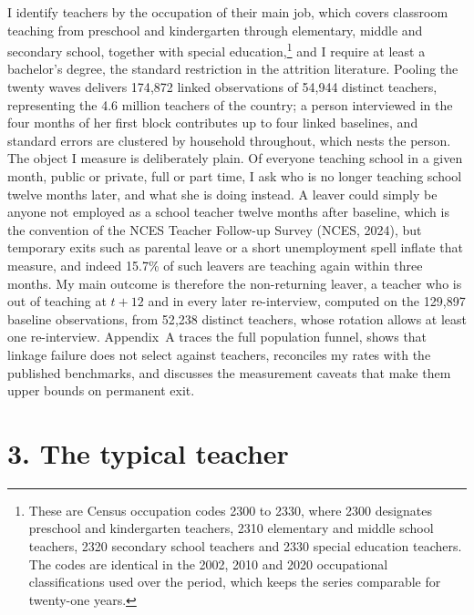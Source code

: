 \documentclass[11pt,a4paper]{article}
\begin{document}
I identify teachers by the occupation of their main job, which covers
classroom teaching from preschool and kindergarten through elementary,
middle and secondary school, together with special
education,\footnote{These are Census occupation codes 2300 to 2330, where
2300 designates preschool and kindergarten teachers, 2310 elementary and
middle school teachers, 2320 secondary school teachers and 2330 special
education teachers. The codes are identical in the 2002, 2010 and 2020
occupational classifications used over the period, which keeps the series
comparable for twenty-one years.} and I require at least a bachelor's
degree, the standard restriction in the attrition literature. Pooling the
twenty waves delivers 174{,}872 linked observations of 54{,}944 distinct
teachers, representing the 4.6 million teachers of the country; a person
interviewed in the four months of her first block contributes up to four
linked baselines, and standard errors are clustered by household
throughout, which nests the person. The object I measure is deliberately
plain. Of everyone teaching school in a given month, public or private,
full or part time, I ask who is no longer teaching school twelve months
later, and what she is doing instead. A leaver could simply be anyone not
employed as a school teacher twelve months after baseline, which is the
convention of the NCES Teacher Follow-up Survey (NCES, 2024), but temporary exits such as
parental leave or a short unemployment spell inflate that measure, and
indeed 15.7\% of such leavers are teaching again within three months. My
main outcome is therefore the non-returning leaver, a teacher who is out of
teaching at $t{+}12$ and in every later re-interview, computed on the
129{,}897 baseline observations, from 52{,}238 distinct teachers, whose
rotation allows at least one re-interview.
Appendix~A traces the full population funnel, shows that linkage failure
does not select against teachers, reconciles my rates with the published
benchmarks, and discusses the measurement caveats that make them upper
bounds on permanent exit.

\section*{3. The typical teacher}
\end{document}
